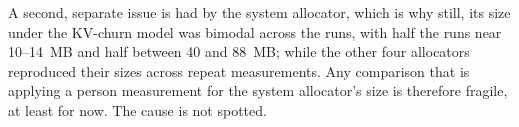 A second, separate issue is had by the system allocator, which is why still, its size under the KV-churn model was bimodal across the runs,
with half the runs near 10--14~MB and half between 40 and 88~MB; while the other four allocators reproduced their sizes
across repeat measurements. Any comparison that is applying a person measurement for the system allocator's size is therefore fragile, at least for now.
The cause is not spotted.
